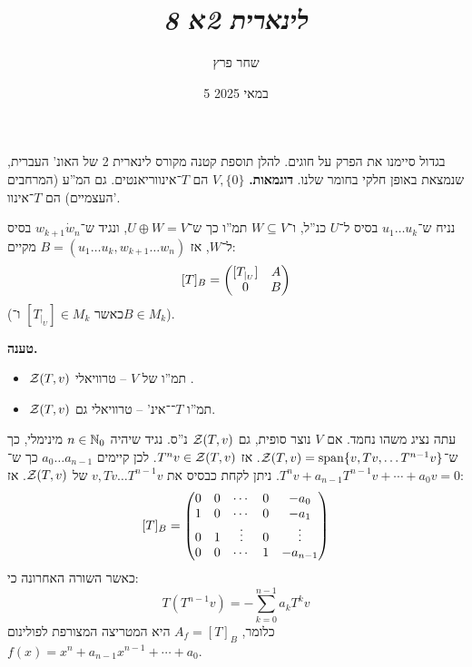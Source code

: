 \documentclass[]{../../../../tex/classes/styledArticle}
\author{שחר פרץ}
\title{\textit{לינארית 2א 8}}
\date{5 במאי 2025}
\begin{document}
    \maketitle
    \section{}
    בגדול סיימנו את הפרק על חוגים. להלן תוספת קטנה מקורס לינארית 2 של האונ' העברית, שנמצאת באופן חלקי בחומר שלנו. 
    \textbf{דוגמאות. }$V, \{0\}$ הם $T$־אינווריאנטים. גם המ''ע (המרחבים העצמיים) הם $T$־אינוו'. 
    
    
    נניח ש־$u_1 \dots u_k$ בסיס ל־$U$ כנ''ל, ו־$W \subseteq V$ תמ''ו כך ש־$U \oplus W = V$, ונגיד ש־$w_{k + 1} \dot w_n$ בסיס ל־$W$, אז $B = (u_1 \dots u_k, w_{k + 1} \dots w_n)$ מקיים: 
    \[ [T]_B = \begin{pmatrix} [T_{|_U}] & A \\ 0 & B \end{pmatrix} \]
    (כאשר $[T_{|_U}] \in M_{k}$ ו־$B \in M_k$). 
    
    \textbf{טענה. }
    \begin{itemize}
        \item $\mathcal{Z}(T, v)$ תמ''ו של $V$ – טרוויאלי .
        \item $\mathcal{Z}(T, v)$ תמ''ו $T$־־אינ' – טרוויאלי גם. 
    \end{itemize}
    
    עתה נציג משהו נחמד. אם $V$ נוצר סופית, גם $\mathcal{Z}(T, v)$ נ''ס. נגיד שיהיה $n \in \mathbb{N}_0$ מינימלי, כך ש־$\mathcal{Z}(T, v) = \operatorname{span}\{v, Tv, \dots T^{n - 1} v\}$. אז $T^nv \in \mathcal{Z}(T, v)$. לכן קיימים $a_0 \dots a_{n - 1}$ כך ש־$T^nv + a_{n - 1}T^{n - 1}v + \cdots + a_0v = 0$. ניתן לקחת כבסיס את $v, Tv \dots T^{n - 1} v$ של $\mathcal{Z}(T, v)$. אז: 
    \[ [T]_B = \begin{pmatrix} 0 & 0 & \cdots & 0 & -a_0
    \\ 1 & 0 & \cdots & 0&-a_1
    \\ 0 & 1 & \vdots & 0& \vdots
    \\ 0 & 0  & \cdots & 1 &-a_{n - 1} \end{pmatrix} \]
    כאשר השורה האחרונה כי: 
    \[ T(T^{n - 1}v)  = -\sum_{k = 0}^{n - 1}a_kT^kv \]
    כלומר, $A_f = [T]_B$ היא המטריצה המצורפת לפולינום $f(x) = x^{n} + a_{n - 1}x^{n - 1} + \cdots + a_0$. 
    
\end{document}
